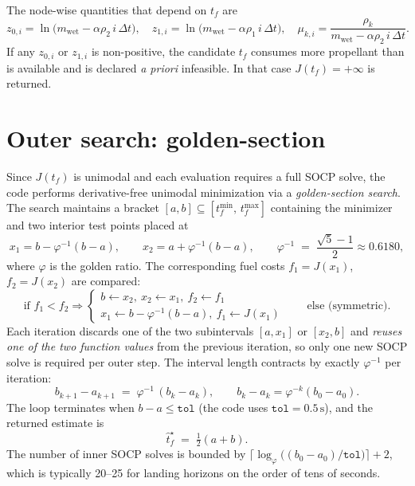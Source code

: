 \documentclass[11pt]{article}
\begin{document}
\noindent The node-wise quantities that depend on $t_f$ are
\begin{equation}
  z_{0,i} = \ln\bigl(m_{\text{wet}} - \alpha\rho_2\, i\,\Delta t\bigr),\quad
  z_{1,i} = \ln\bigl(m_{\text{wet}} - \alpha\rho_1\, i\,\Delta t\bigr),\quad
  \mu_{k,i} = \frac{\rho_k}{m_{\text{wet}} - \alpha\rho_2\, i\,\Delta t}.
  \label{eq:nodeparams}
\end{equation}
%
If any $z_{0,i}$ or $z_{1,i}$ is non-positive, the candidate $t_f$ consumes
more propellant than is available and is declared \emph{a priori} infeasible.
In that case $J(t_f) = +\infty$ is returned.

\section{Outer search: golden-section}

Since $J(t_f)$ is unimodal and each evaluation requires a full SOCP solve,
the code performs derivative-free unimodal minimization via a
\emph{golden-section search}. The search maintains a bracket
$[a, b] \subseteq [t_f^{\min},\,t_f^{\max}]$ containing the minimizer and
two interior test points placed at
%
\begin{equation}
  x_1 = b - \varphi^{-1}(b - a),
  \qquad
  x_2 = a + \varphi^{-1}(b - a),
  \qquad
  \varphi^{-1} \;=\; \frac{\sqrt{5}-1}{2} \approx 0.6180,
  \label{eq:gsspoints}
\end{equation}
%
where $\varphi$ is the golden ratio. The corresponding fuel costs
$f_1 = J(x_1)$, $f_2 = J(x_2)$ are compared:
%
\begin{equation}
  \text{if } f_1 < f_2 \Rightarrow
    \begin{cases}
      b \leftarrow x_2,\ x_2 \leftarrow x_1,\ f_2 \leftarrow f_1\\
      x_1 \leftarrow b - \varphi^{-1}(b-a),\ f_1 \leftarrow J(x_1)
    \end{cases}
  \qquad \text{else (symmetric).}
  \label{eq:gssupdate}
\end{equation}
%
Each iteration discards one of the two subintervals
$[a, x_1]$ or $[x_2, b]$ and \emph{reuses one of the two function values}
from the previous iteration, so only one new SOCP solve is required per
outer step. The interval length contracts by exactly $\varphi^{-1}$ per
iteration:
%
\begin{equation}
  b_{k+1} - a_{k+1} \;=\; \varphi^{-1}\,(b_k - a_k),
  \qquad
  b_k - a_k = \varphi^{-k}(b_0 - a_0).
\end{equation}
%
The loop terminates when $b - a \le \texttt{tol}$ (the code uses
$\texttt{tol}=0.5\,\text{s}$), and the returned estimate is
%
\begin{equation}
  \hat t_f^\star \;=\; \tfrac{1}{2}(a + b).
\end{equation}
%
The number of inner SOCP solves is bounded by
$\lceil \log_{\varphi}\!\bigl((b_0 - a_0)/\texttt{tol}\bigr) \rceil + 2$,
which is typically 20--25 for landing horizons on the order of tens of
seconds.
\end{document}
